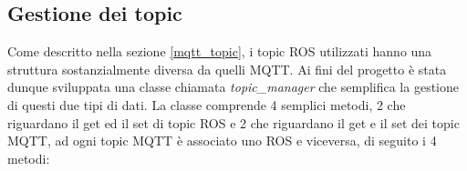 \subsection{Gestione dei topic} \label{gestione_dei_topic}
Come descritto nella sezione \ref{mqtt_topic}, i topic ROS utilizzati hanno una struttura sostanzialmente diversa da quelli MQTT. Ai fini del progetto è stata dunque sviluppata una classe chiamata \textit{topic\_manager} che semplifica la gestione di questi due tipi di dati. La classe comprende 4 semplici metodi, 2 che riguardano il get ed il set di topic ROS e 2 che riguardano il get e il set dei topic MQTT, ad ogni topic MQTT è associato uno ROS e viceversa, di seguito i 4 metodi:

